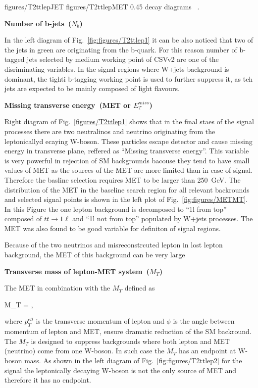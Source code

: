                 {figures/T2ttlepJET} %
                 {figures/T2ttlepMET} %
                 {0.45}       %
                 { decay diagrams ~\cite{website:SUSYdiagrams}. }

\textbf{Number of b-jets~($N_{b}$)}

In the left diagram of Fig.~\ref{fig:figures/T2ttlep1} it can be also noticed that two of the jets in green are originating from the b-quark. For this reason number of b-tagged jets selected by medium working point of CSVv2 are one of the disriminating variables. In the signal regions where W+jets background is dominant, the tighti b-tagging working point is used to further suppress it, as teh jets are expected to be mainly composed of light flavours.

\textbf{Missing transverse energy~(MET or $E_{T}^{miss}$)}

Right diagram of Fig.~\ref{figures/T2ttlep1} shows that in the final staes of the signal processes there are two neutralinos and neutrino originating from the leptonicallyd ecaying W-boson. These particles escape detector and cause missing energy in transverse plane, reffered as ``Missing transverse energy''. This variable is very powerful in rejection of SM backgrounds bacouse they tend to have small values of MET as the sources of the MET are more limited than in case of signal. Therefore the basline selection requires MET to be larger than 250~GeV. The distribution of the MET in the baseline search region for all relevant backrounds and selected signal points is shown in the left plot of Fig.~\ref{fig:figures/METMT}. In this Figure the one lepton background is decomposed to ``1l from top'' composed of $t \bar{t} \to 1\ell$ and ``1l not from top'' populated by W+jets processes. The MET was also found to be good variable for definiton of signal regions.

Because of the two neutrinos and misreconstrcuted lepton in lost lepton background, the MET of this background can be very large

\textbf{Transverse mass of lepton-MET system~($M_{T}$)}

The MET in combination with the $M_{T}$ defined as

{
 M_{T} =  ,
}

where $p_{T}^{ell}$ is the transverse momentum of lepton and $\phi$ is the angle between momentum of lepton and MET, ensure dramatic reduction of the SM backround. The $M_{T}$ is  designed to suppress backgrounds where both lepton and MET (neutrino) come from one W-boson. In such case the $M_{T}$ has an endpoint at W-boson mass. As shown in the left diagram of Fig.~\ref{fig:figures/T2ttlep2} for the signal the leptonically decaying W-boson is not the only source of MET and therefore it has no endpoint.

